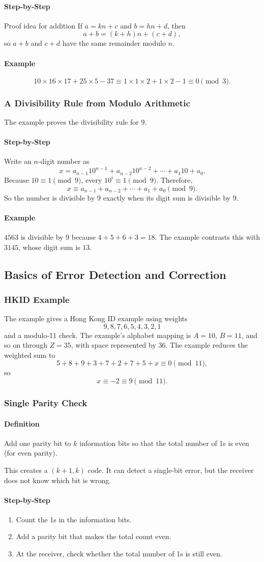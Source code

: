 \documentclass[12pt]{article}
\newcommand{\Definition}{\paragraph{Definition}}
\newcommand{\Step}{\paragraph{Step-by-Step}}
\newcommand{\Example}{\paragraph{Example}}
\begin{document}
\Step{Proof idea for addition}
If $a=kn+c$ and $b=hn+d$, then
\[
a+b=(k+h)n+(c+d),
\]
so $a+b$ and $c+d$ have the same remainder modulo $n$.

\Example
\[
10\times16\times17+25\times5-37
\equiv1\times1\times2+1\times2-1
\equiv0\pmod3.
\]

\subsubsection{A Divisibility Rule from Modulo Arithmetic}
The example proves the divisibility rule for 9.

\Step
Write an $n$-digit number as
\[
x=a_{n-1}10^{n-1}+a_{n-2}10^{n-2}+\cdots+a_1 10+a_0.
\]
Because $10\equiv1\pmod9$, every $10^i\equiv1\pmod9$. Therefore,
\[
x\equiv a_{n-1}+a_{n-2}+\cdots+a_1+a_0\pmod9.
\]
So the number is divisible by 9 exactly when its digit sum is divisible by 9.

\Example $4563$ is divisible by 9 because $4+5+6+3=18$. The example contrasts this with $3145$, whose digit sum is $13$.

\subsection{Basics of Error Detection and Correction}

\subsubsection{HKID Example}
The example gives a Hong Kong ID example using weights
\[
9,8,7,6,5,4,3,2,1
\]
and a modulo-11 check. The example's alphabet mapping is $A=10$, $B=11$, and so on through $Z=35$, with space represented by 36. The example reduces the weighted sum to
\[
5+8+9+3+7+2+7+5+x\equiv0\pmod{11},
\]
so
\[
x\equiv-2\equiv9\pmod{11}.
\]

\subsubsection{Single Parity Check}
\Definition Add one parity bit to $k$ information bits so that the total number of 1s is even (for even parity).

This creates a $(k+1,k)$ code. It can detect a single-bit error, but the receiver does not know which bit is wrong.

\Step
\begin{enumerate}
    \item Count the 1s in the information bits.
    \item Add a parity bit that makes the total count even.
    \item At the receiver, check whether the total number of 1s is still even.
\end{enumerate}
\end{document}
